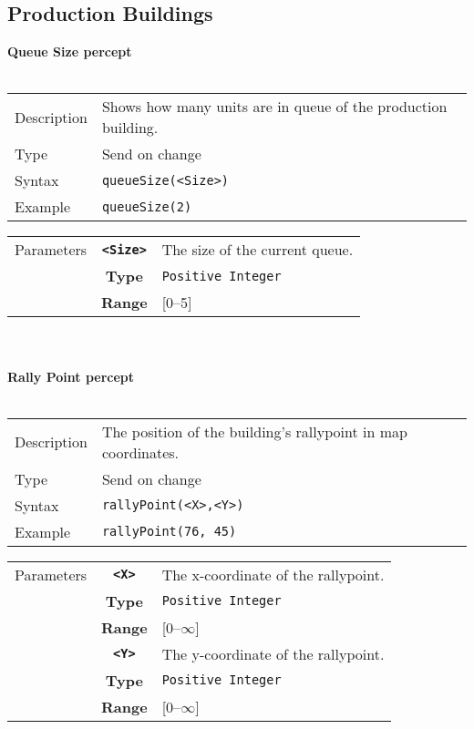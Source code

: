 \subsection{Production Buildings}
\textbf{Queue Size percept}\\
\\
\begin{tabularx}{\textwidth}{lX}
 Description & Shows how many units are in queue of the production building.\\
 Type & Send on change \\
 Syntax & \verb|queueSize(<Size>)| \\
 Example & \verb|queueSize(2)| \\
 \end{tabularx}
 \begin{tabularx}{\textwidth}{l | c | p{8cm}|}
 \cline{2-3}
 Parameters & \textbf{\verb|<Size>|} & The size of the current queue. \\
            & \textbf{Type} & \verb|Positive Integer| \\
            & \textbf{Range} & [0--5] \\
            \cline{2-3}
\end{tabularx}\\
\\
\noindent
\textbf{Rally Point percept}\\
\\
\begin{tabularx}{\textwidth}{lX}
 Description & The position of the building's rallypoint in map coordinates. \\
 Type & Send on change \\
 Syntax & \verb|rallyPoint(<X>,<Y>)| \\
 Example & \verb|rallyPoint(76, 45)| \\
 \end{tabularx}
 \begin{tabularx}{\textwidth}{l | c | p{8cm}|}
 \cline{2-3}
 Parameters & \textbf{\verb|<X>|} & The x-coordinate of the rallypoint.\\
            & \textbf{Type} & \verb|Positive Integer| \\
            & \textbf{Range} & [0--$\infty$] \\
            \cline{2-3}
            & \textbf{\verb|<Y>|} & The y-coordinate of the rallypoint.\\
            & \textbf{Type} & \verb|Positive Integer| \\
            & \textbf{Range} & [0--$\infty$] \\
            \cline{2-3}
\end{tabularx}\\
\\

